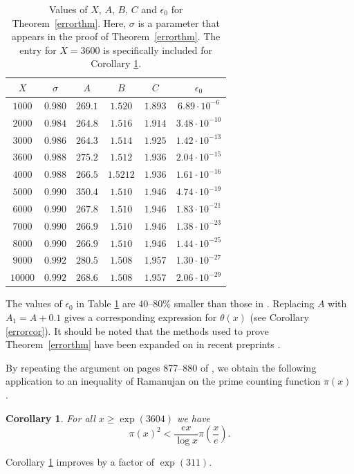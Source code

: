 \documentclass[reqno]{amsart}
\newtheorem{corollary}[theorem]{Corollary}
\numberwithin{equation}{section}
\theoremstyle{remark}
\begin{document}
\def\arraystretch{1.5}
\begin{table}[h]
\centering
\caption{Values of $X$, $A$, $B$, $C$ and $\epsilon_0$ for Theorem~\ref{errorthm}. Here, $\sigma$ is a parameter that appears in the proof of Theorem~\ref{errorthm}. The entry for $X=3600$ is specifically included for Corollary \ref{ramancor}.}
\begin{tabular}{|c|c|c|c|c|c|}
\hline
$X$ & $\sigma$ & $A$ & $B$ & $C$ & $\epsilon_0$\\
\hline
$1000$ & $0.980$ & $269.1$ & $1.520$ & $1.893$ & $6.89\cdot 10^{-6}$ \\
\hline
$2000$ & $0.984$ & $264.8$ & $1.516$ & $1.914$ & $3.48\cdot 10^{-10}$\\
\hline
$3000$ & $0.986$ & $264.3$ & $1.514$ & $1.925$ & $1.42\cdot 10^{-13}$\\
\hline
$3600$ & $0.988$ & $275.2$ & $1.512$ & $1.936$ & $2.04\cdot 10^{-15}$\\
\hline
$4000$ & $0.988$ & $266.5$ & $1.5212$ & $1.936$ & $1.61\cdot 10^{-16}$\\
\hline
$5000$ & $0.990$ & $350.4$ & $1.510$ & $1.946$ & $4.74\cdot 10^{-19}$\\
\hline
$6000$ & $0.990$ & $267.8$ & $1.510$ & $1.946$ & $1.83\cdot 10^{-21}$\\
\hline
$7000$ & $0.990$ & $266.9$ & $1.510$ & $1.946$ & $1.38\cdot 10^{-23}$\\
\hline
$8000$ & $0.990$ & $266.9$ & $1.510$ & $1.946$ & $1.44\cdot 10^{-25}$\\
\hline
$9000$ & $0.992$ & $280.5$ & $1.508$ & $1.957$ & $1.30\cdot 10^{-27}$\\
\hline
$10000$ & $0.992$ & $268.6$ & $1.508$ & $1.957$ & $2.06\cdot 10^{-29}$\\
\hline
\end{tabular}
\label{errortable}
\end{table}

The values of $\epsilon_0$ in Table \ref{errortable} are 40--80$\%$ smaller than those in \cite[Table 1]{P_T_2021}. Replacing $A$ with $A_1=A+0.1$ gives a corresponding expression for $\theta(x)$ (see Corollary \ref{errorcor}). It should be noted that the methods used to prove Theorem~\ref{errorthm} have been expanded on in recent preprints \cite{fiorisharper2022,johnstonsome2022}. 

By repeating the argument on pages 877--880 of \cite{P_T_2021}, we obtain the following application to an inequality of Ramanujan on the prime counting function $\pi(x)$. 
\begin{corollary}\label{ramancor}
    For all $x\geq\exp(3604)$ we have
    \begin{equation*}
        \pi(x)^2<\frac{ex}{\log x}\pi\left(\frac{x}{e}\right).
    \end{equation*}
\end{corollary}
Corollary \ref{ramancor} improves \cite[Theorem 2]{P_T_2021} by a factor of $\exp(311)$.
\end{document}
